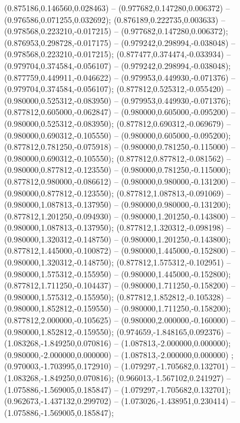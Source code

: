  (0.875186,0.146560,0.028463) -- (0.977682,0.147280,0.006372) -- (0.976586,0.071255,0.032692);
 (0.876189,0.222735,0.003633) -- (0.978568,0.223210,-0.017215) -- (0.977682,0.147280,0.006372);
 (0.876953,0.298728,-0.017175) -- (0.979242,0.298994,-0.038048) -- (0.978568,0.223210,-0.017215);
 (0.877477,0.374474,-0.033934) -- (0.979704,0.374584,-0.056107) -- (0.979242,0.298994,-0.038048);
 (0.877759,0.449911,-0.046622) -- (0.979953,0.449930,-0.071376) -- (0.979704,0.374584,-0.056107);
 (0.877812,0.525312,-0.055420) -- (0.980000,0.525312,-0.083950) -- (0.979953,0.449930,-0.071376);
 (0.877812,0.605000,-0.062847) -- (0.980000,0.605000,-0.095200) -- (0.980000,0.525312,-0.083950);
 (0.877812,0.690312,-0.069679) -- (0.980000,0.690312,-0.105550) -- (0.980000,0.605000,-0.095200);
 (0.877812,0.781250,-0.075918) -- (0.980000,0.781250,-0.115000) -- (0.980000,0.690312,-0.105550);
 (0.877812,0.877812,-0.081562) -- (0.980000,0.877812,-0.123550) -- (0.980000,0.781250,-0.115000);
 (0.877812,0.980000,-0.086612) -- (0.980000,0.980000,-0.131200) -- (0.980000,0.877812,-0.123550);
 (0.877812,1.087813,-0.091069) -- (0.980000,1.087813,-0.137950) -- (0.980000,0.980000,-0.131200);
 (0.877812,1.201250,-0.094930) -- (0.980000,1.201250,-0.143800) -- (0.980000,1.087813,-0.137950);
 (0.877812,1.320312,-0.098198) -- (0.980000,1.320312,-0.148750) -- (0.980000,1.201250,-0.143800);
 (0.877812,1.445000,-0.100872) -- (0.980000,1.445000,-0.152800) -- (0.980000,1.320312,-0.148750);
 (0.877812,1.575312,-0.102951) -- (0.980000,1.575312,-0.155950) -- (0.980000,1.445000,-0.152800);
 (0.877812,1.711250,-0.104437) -- (0.980000,1.711250,-0.158200) -- (0.980000,1.575312,-0.155950);
 (0.877812,1.852812,-0.105328) -- (0.980000,1.852812,-0.159550) -- (0.980000,1.711250,-0.158200);
 (0.877812,2.000000,-0.105625) -- (0.980000,2.000000,-0.160000) -- (0.980000,1.852812,-0.159550);
 (0.974659,-1.848165,0.092376) -- (1.083268,-1.849250,0.070816) -- (1.087813,-2.000000,0.000000);
 (0.980000,-2.000000,0.000000) -- (1.087813,-2.000000,0.000000) ;
 (0.970003,-1.703995,0.172910) -- (1.079297,-1.705682,0.132701) -- (1.083268,-1.849250,0.070816);
 (0.966013,-1.567102,0.241927) -- (1.075886,-1.569005,0.185847) -- (1.079297,-1.705682,0.132701);
 (0.962673,-1.437132,0.299702) -- (1.073026,-1.438951,0.230414) -- (1.075886,-1.569005,0.185847);
